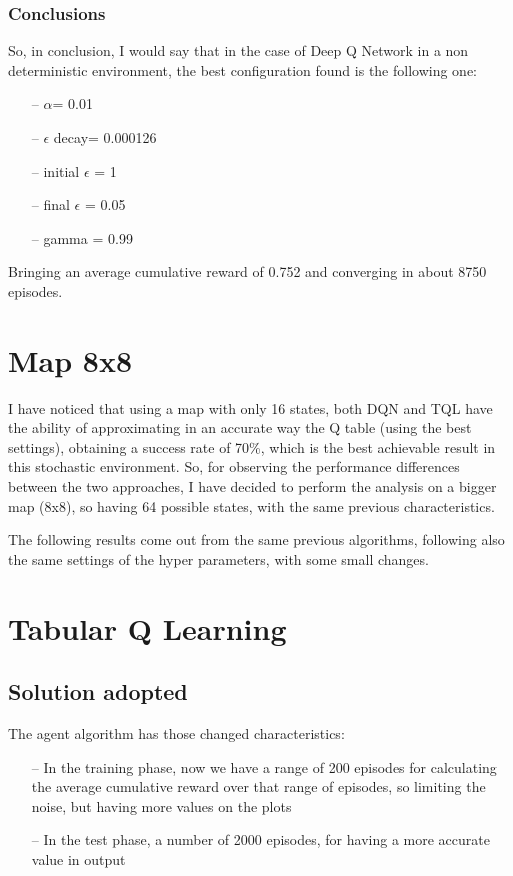 \documentclass{article}
\begin{document}
\subsubsection{Conclusions}

So, in conclusion, I would say that in the case of Deep Q Network in a non deterministic environment, the best configuration found is the following one:
\begin{itemize}
\item[--] $\alpha$= 0.01
\item[--] $\epsilon$ decay= 0.000126
\item[--] initial $\epsilon$ = 1
\item[--] final $\epsilon$ = 0.05
\item[--] gamma = 0.99
\end{itemize}

Bringing an average cumulative reward of 0.752 and converging in about 8750 episodes.   




\section{Map 8x8}

I have noticed that using a map with only 16 states, both DQN and TQL have the ability of approximating in an accurate way the Q table (using the best settings), obtaining a success rate of 70\%, which is the best achievable result in this stochastic environment.
So, for observing the performance differences between the two approaches, I have decided to perform the analysis on a bigger map (8x8), so having 64 possible states, with the same previous characteristics.

The following results come out from the same previous algorithms, following also the same settings of the hyper parameters, with some small changes.

\section{Tabular Q Learning}

\subsection{Solution adopted}

The agent algorithm has those changed characteristics:
\begin{itemize}
\item[--] In the training phase, now we have a range of 200 episodes for calculating the average cumulative reward over that range of episodes, so limiting the noise, but having more values on the plots
\item[--] In the test phase, a number of 2000 episodes, for having a more accurate value in output
\end{itemize}
\end{document}
